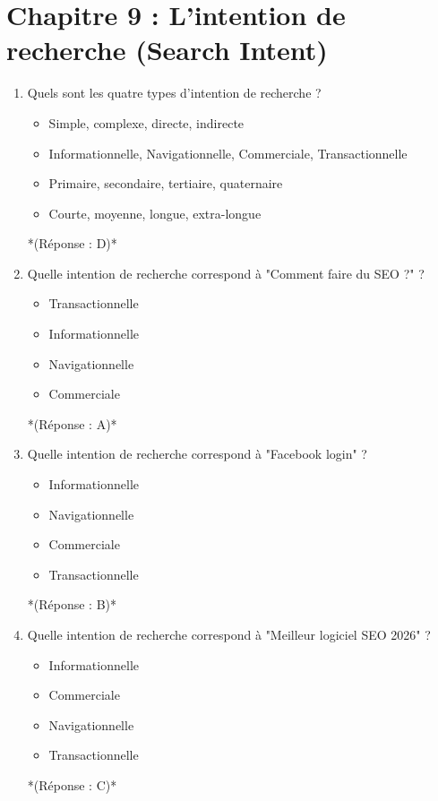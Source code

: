 \documentclass[12pt,a4paper,twoside]{report}
\begin{document}
\newpage

\section*{Chapitre 9 : L'intention de recherche (Search Intent)}

\begin{enumerate}
\item Quels sont les quatre types d'intention de recherche ?
\begin{itemize}
\item[A)] Simple, complexe, directe, indirecte
\item[B)] Informationnelle, Navigationnelle, Commerciale, Transactionnelle
\item[C)] Primaire, secondaire, tertiaire, quaternaire
\item[D)] Courte, moyenne, longue, extra-longue
\end{itemize}
*(Réponse : D)*

\item Quelle intention de recherche correspond à "Comment faire du SEO ?" ?
\begin{itemize}
\item[A)] Transactionnelle
\item[B)] Informationnelle
\item[C)] Navigationnelle
\item[D)] Commerciale
\end{itemize}
*(Réponse : A)*

\item Quelle intention de recherche correspond à "Facebook login" ?
\begin{itemize}
\item[A)] Informationnelle
\item[B)] Navigationnelle
\item[C)] Commerciale
\item[D)] Transactionnelle
\end{itemize}
*(Réponse : B)*

\item Quelle intention de recherche correspond à "Meilleur logiciel SEO 2026" ?
\begin{itemize}
\item[A)] Informationnelle
\item[B)] Commerciale
\item[C)] Navigationnelle
\item[D)] Transactionnelle
\end{itemize}
*(Réponse : C)*


\end{enumerate}
\end{document}
